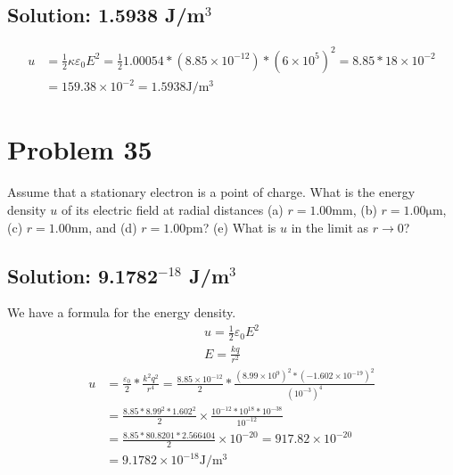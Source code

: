 \documentclass[12pt]{article}
\begin{document}
\subsection{Solution: 1.5938 J/m$^3$}
\begin{align*}
    u   &=  \frac{1}{2}\kappa\varepsilon_0 E^2
        =   \frac{1}{2}1.00054*(8.85 \times 10^{-12})*(6 \times 10^5)^2
        =   8.85 * 18 \times 10^{-2}\\
        &=  159.38 \times 10^{-2}
        =   \boxed{1.5938 \unit{\joule/\meter^3}}
\end{align*}

\pagebreak
\section{Problem 35}
Assume that a stationary electron is a point of charge. 
What is the energy density $u$ of its electric field at radial distances (a) $r = 1.00 \unit{\milli\meter}$, (b) $r = 1.00 \unit{\micro\meter}$, (c) $r = 1.00 \unit{\nano\meter}$, and (d) $r = 1.00 \unit{\pico\meter}$? 
(e) What is $u$ in the limit as $r \rightarrow 0$?

\subsection{Solution: 9.1782$^{-18}$ J/m$^3$}
We have a formula for the energy density.
\begin{gather*}
    u = \frac{1}{2}\varepsilon_0E^2\\
    E   =   \frac{kq}{r^2}
\end{gather*}\begin{align*}
    u   &=  \frac{\varepsilon_0}{2}*\frac{k^2q^2}{r^4}
        =   \frac{8.85 \times 10^{-12}}{2}*\frac{(8.99 \times 10^9)^2*(-1.602 \times 10^{-19})^2}{(10^{-3})^4}\\
        &=  \frac{8.85 * 8.99^2 * 1.602^2}{2} \times \frac{10^{-12} * 10^{18} * 10^{-38}}{10^{-12}}\\
        &=  \frac{8.85*80.8201*2.566404}{2} \times 10^{-20}
        =   917.82 \times 10^{-20}\\
        &=  \boxed{9.1782 \times 10^{-18} \unit{\joule/\meter^3}}
\end{align*}
\end{document}
